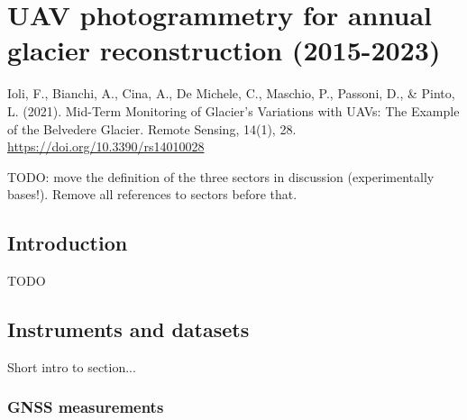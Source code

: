 \graphicspath{{figures/chapter3/}}
\onehalfspacing

\chapter{UAV photogrammetry for annual glacier reconstruction (2015-2023)}\label{ch:3}

\vfill


\noindent Ioli, F., Bianchi, A., Cina, A., De Michele, C., Maschio, P., Passoni, D., \&
Pinto, L. (2021). Mid-Term Monitoring of Glacier’s Variations with UAVs: The Example of
the Belvedere Glacier. Remote Sensing, 14(1), 28.
\url{https://doi.org/10.3390/rs14010028}

\newpage

{\color{red} TODO: move the definition of the three sectors in discussion (experimentally bases!). Remove all references to sectors before that.}


\section{Introduction}\label{sec:3:intro}

{\color{red} TODO}


\section{Instruments and datasets}\label{sec:3:instrument}

{\color{red} Short intro to section...}

 
\subsection{GNSS measurements}\label{sec:3:gnss}


